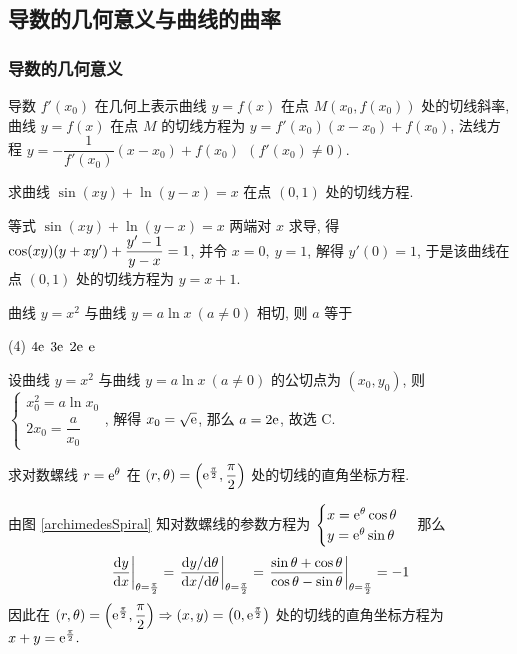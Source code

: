 \subsection{导数的几何意义与曲线的曲率}

\subsubsection{导数的几何意义}

导数 $f'(x_0)$ 在几何上表示曲线 $y=f(x)$ 在点 $M(x_0,f(x_0))$ 处的切线斜率, 曲线 $y=f(x)$ 在点 $M$ 的切线方程为 $y=f'(x_0)(x-x_0)+f(x_0)$, 法线方程 $y=-\dfrac{1}{f'(x_0)}(x-x_0)+f(x_0)~~(f'(x_0)\neq 0).$

\begin{example}[2008 数一]
    求曲线 $\sin(xy)+\ln(y-x)=x$ 在点 $(0,1)$ 处的切线方程.
\end{example}
\begin{solution}
    等式 $\sin(xy)+\ln(y-x)=x$ 两端对 $x$ 求导, 得 $\cos(xy)\qty(y+xy')+\dfrac{y'-1}{y-x}=1$, 并令 $x=0,~y=1$, 解得 $y'(0)=1$, 于是该曲线在点 $(0,1)$ 处的切线方程为 $y=x+1.$
\end{solution}

\begin{example}[2010 数二]
    曲线 $y=x^2$ 与曲线 $y=a\ln x~(a\neq 0)$ 相切, 则 $a$ 等于
    \begin{tasks}(4)
        \task $4\mathrm{e}$
        \task $3\mathrm{e}$
        \task $2\mathrm{e}$
        \task $\mathrm{e}$
    \end{tasks}
\end{example}
\begin{solution}
    设曲线 $y=x^2$ 与曲线 $y=a\ln x~(a\neq 0)$ 的公切点为 $(x_0,y_0)$, 则 $\begin{cases}
            x_0^2=a\ln x_0 \\2x_0=\dfrac{a}{x_0}
        \end{cases}$, 解得 $x_0=\sqrt{\mathrm{e}}$, 那么 $a=2\mathrm{e}$, 故选 C.
\end{solution}

\begin{example}
    求对数螺线 $r=\mathrm{e}^\theta$ 在 $(r,\theta)=\qty(\mathrm{e} ^{\frac{\pi}{2}},\dfrac{\pi}{2})$ 处的切线的直角坐标方程.
\end{example}
\begin{solution}
    由图 \ref{archimedesSpiral} 知对数螺线的参数方程为 $\begin{cases}
        x=\mathrm{e}^\theta\cos\theta\\y=\mathrm{e}^\theta\sin\theta
    \end{cases}$ 那么 
    $$\eval{\dv{y}{x}}_{\theta=\frac{\pi}{2}}=\eval{\dfrac{\dd y/\dd \theta}{\dd x/\dd \theta}}_{\theta=\frac{\pi}{2}}=\eval{\dfrac{\sin\theta+\cos\theta}{\cos\theta-\sin\theta}}_{\theta=\frac{\pi}{2}}=-1$$
    因此在 $(r,\theta)=\qty(\mathrm{e} ^{\frac{\pi}{2}},\dfrac{\pi}{2})\Rightarrow (x,y)=\qty(0,\mathrm{e} ^{\frac{\pi}{2}})$ 处的切线的直角坐标方程为 $x+y=\mathrm{e} ^{\frac{\pi}{2}}.$
\end{solution}

